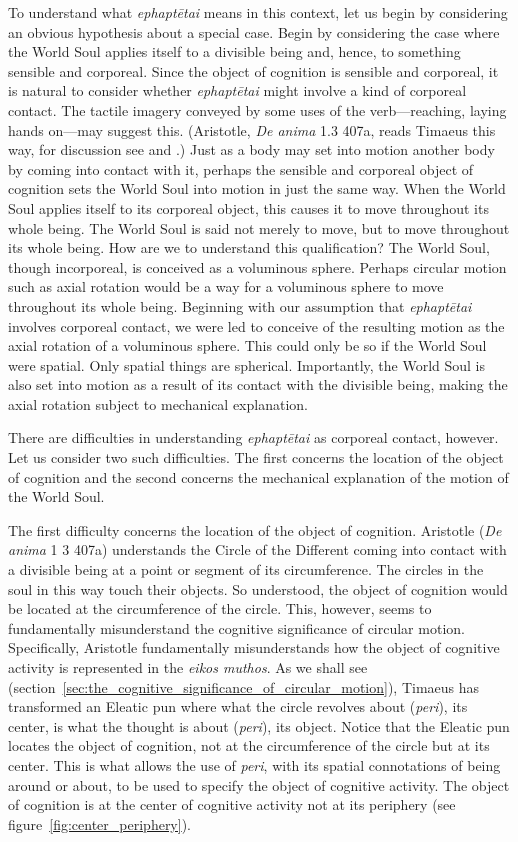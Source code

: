 To understand what \emph{ephaptētai} means in this context, let us begin by considering an obvious hypothesis about a special case. Begin by considering the case where the World Soul applies itself to a divisible being and, hence, to something sensible and corporeal. Since the object of cognition is sensible and corporeal, it is natural to consider whether \emph{ephaptētai} might involve a kind of corporeal contact. The tactile imagery conveyed by some uses of the verb---reaching, laying hands on---may suggest this. (Aristotle, \emph{De anima} 1.3 407a, reads Timaeus this way, for discussion see \citealt[392--5, 404--7]{Cherniss:1944aa} and \citealt[82--6]{Lee:1976xs}.) Just as a body may set into motion another body by coming into contact with it, perhaps the sensible and corporeal object of cognition sets the World Soul into motion in just the same way. When the World Soul applies itself to its corporeal object, this causes it to move throughout its whole being. The World Soul is said not merely to move, but to move throughout its whole being. How are we to understand this qualification? The World Soul, though incorporeal, is conceived as a voluminous sphere. Perhaps circular motion such as axial rotation would be a way for a voluminous sphere to move throughout its whole being. Beginning with our assumption that \emph{ephaptētai} involves corporeal contact, we were led to conceive of the resulting motion as the axial rotation of a voluminous sphere. This could only be so if the World Soul were spatial. Only spatial things are spherical. Importantly, the World Soul is also set into motion as a result of its contact with the divisible being, making the axial rotation subject to mechanical explanation.

There are difficulties in understanding \emph{ephaptētai} as corporeal contact, however. Let us consider two such difficulties. The first concerns the location of the object of cognition and the second concerns the mechanical explanation of the motion of the World Soul.

The first difficulty concerns the location of the object of cognition. Aristotle (\emph{De anima} 1 3 407a) understands the Circle of the Different coming into contact with a divisible being at a point or segment of its circumference. The circles in the soul in this way touch their objects. So understood, the object of cognition would be located at the circumference of the circle. This, however, seems to fundamentally misunderstand the cognitive significance of circular motion. Specifically, Aristotle fundamentally misunderstands how the object of cognitive activity is represented in the \emph{eikos muthos}. As we shall see (section~\ref{sec:the_cognitive_significance_of_circular_motion}), Timaeus has transformed an Eleatic pun where what the circle revolves about (\emph{peri}), its center, is what the thought is about (\emph{peri}), its object. Notice that the Eleatic pun locates the object of cognition, not at the circumference of the circle but at its center. This is what allows the use of \emph{peri}, with its spatial connotations of being around or about, to be used to specify the object of cognitive activity. The object of cognition is at the center of cognitive activity not at its periphery (see figure~\ref{fig:center_periphery}).

